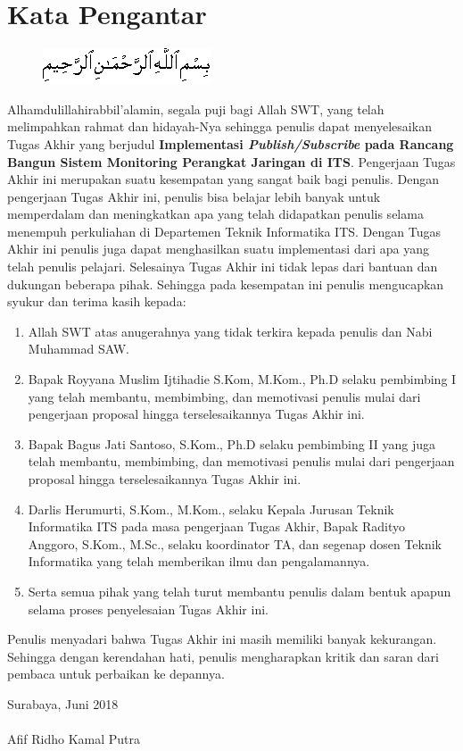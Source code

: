 \chapter{Kata Pengantar}
		\begin{figure}[h]
			\centering
			\includegraphics[width=0.5\linewidth]{img/bismillah.png}
		\end{figure}

		Alhamdulillahirabbil’alamin, segala puji bagi Allah SWT, yang telah melimpahkan rahmat dan hidayah-Nya sehingga penulis dapat menyelesaikan Tugas Akhir yang berjudul \textbf{Implementasi \textit{Publish/Subscribe} pada Rancang Bangun Sistem Monitoring Perangkat Jaringan di ITS}. Pengerjaan Tugas Akhir ini merupakan suatu kesempatan yang sangat baik bagi penulis. Dengan pengerjaan Tugas Akhir ini, penulis bisa belajar lebih banyak untuk memperdalam dan meningkatkan apa yang telah didapatkan penulis selama menempuh perkuliahan di Departemen Teknik Informatika ITS. Dengan Tugas Akhir ini penulis juga dapat menghasilkan suatu implementasi dari apa yang telah penulis pelajari.
		Selesainya Tugas Akhir ini tidak lepas dari bantuan dan dukungan beberapa pihak. Sehingga pada kesempatan ini penulis mengucapkan syukur dan terima kasih kepada:
		\begin{enumerate}
			\item Allah SWT atas anugerahnya yang tidak terkira kepada penulis dan Nabi Muhammad SAW.
			\item Bapak Royyana Muslim Ijtihadie S.Kom, M.Kom., Ph.D selaku pembimbing I yang telah membantu, membimbing, dan memotivasi penulis mulai dari pengerjaan proposal hingga terselesaikannya Tugas Akhir ini.
			\item Bapak Bagus Jati Santoso, S.Kom., Ph.D selaku pembimbing II yang juga telah membantu, membimbing, dan memotivasi penulis mulai dari pengerjaan proposal hingga terselesaikannya Tugas Akhir ini.
			\item Darlis Herumurti, S.Kom., M.Kom., selaku Kepala Jurusan Teknik Informatika ITS pada masa pengerjaan Tugas Akhir, Bapak Radityo Anggoro, S.Kom., M.Sc., selaku koordinator TA, dan segenap dosen Teknik Informatika yang telah memberikan ilmu dan pengalamannya.
			\item Serta semua pihak yang telah turut membantu penulis dalam bentuk apapun selama  proses penyelesaian Tugas Akhir ini.
		\end{enumerate}

		Penulis menyadari bahwa Tugas Akhir ini masih memiliki banyak kekurangan. Sehingga dengan kerendahan hati, penulis mengharapkan kritik dan saran dari pembaca untuk perbaikan ke depannya.

		\hfill Surabaya, Juni 2018 \\ \\
		\hfill Afif Ridho Kamal Putra
